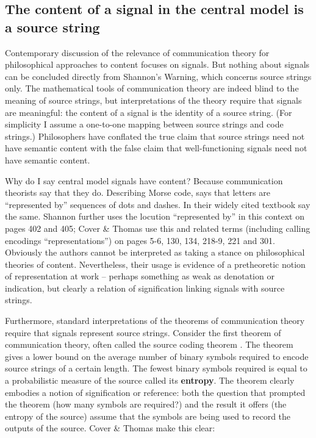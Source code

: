 \subsection{The content of a signal in the central model is a source string}\label{subsec:signalContent}

Contemporary discussion of the relevance of communication theory for philosophical approaches to content focuses on signals.
But nothing about signals can be concluded directly from {\sc Shannon's Warning}, which concerns source strings only.
The mathematical tools of communication theory are indeed blind to the meaning of source strings, but interpretations of the theory require that signals are meaningful: the content of a signal is the identity of a source string.
(For simplicity I assume a one-to-one mapping between source strings and code strings.)
Philosophers have conflated the true claim that source strings need not have semantic content with the false claim that well-functioning signals need not have semantic content.

Why do I say central model signals have content?
Because communication theorists say that they do.
Describing Morse code, \citet[385]{shannon1948mathematicalc} says that letters are ``represented by'' sequences of dots and dashes.
In their widely cited textbook \citet[105]{cover2006elements} say the same.
Shannon further uses the locution ``represented by'' in this context on pages 402 and 405; Cover \& Thomas use this and related terms (including calling encodings ``representations'') on pages 5-6, 130, 134, 218-9, 221 and 301.
Obviously the authors cannot be interpreted as taking a stance on philosophical theories of content.
Nevertheless, their usage is evidence of a pretheoretic notion of representation at work -- perhaps something as weak as denotation or indication, but clearly a relation of signification linking signals with source strings.

Furthermore, standard interpretations of the theorems of communication theory require that signals represent source strings.
Consider the first theorem of communication theory, often called the source coding theorem \citep[$\S$5]{cover2006elements} \citep[$\S$4]{mackay2003information}.
The theorem gives a lower bound on the average number of binary symbols required to encode source strings of a certain length.
The fewest binary symbols required is equal to a probabilistic measure of the source called its \textbf{entropy}.
The theorem clearly embodies a notion of signification or reference: both the question that prompted the theorem (how many symbols are required?) and the result it offers (the entropy of the source) assume that the symbols are being used to record the outputs of the source.
Cover \& Thomas make this clear:

